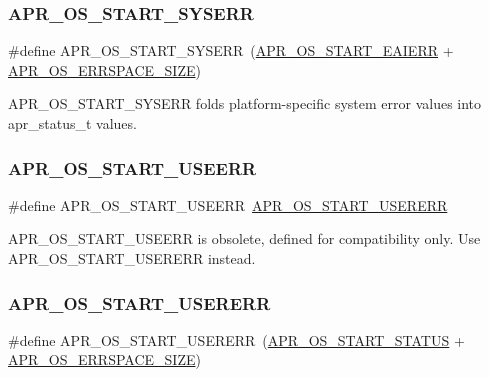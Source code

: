 \subsubsection{\texorpdfstring{A\+P\+R\+\_\+\+O\+S\+\_\+\+S\+T\+A\+R\+T\+\_\+\+S\+Y\+S\+E\+RR}{APR\_OS\_START\_SYSERR}}
{\footnotesize\ttfamily \#define A\+P\+R\+\_\+\+O\+S\+\_\+\+S\+T\+A\+R\+T\+\_\+\+S\+Y\+S\+E\+RR~(\mbox{\hyperlink{group__apr__errno_ga2d04991cb57c67a896e22125a1f22b49}{A\+P\+R\+\_\+\+O\+S\+\_\+\+S\+T\+A\+R\+T\+\_\+\+E\+A\+I\+E\+RR}} + \mbox{\hyperlink{group__apr__errno_gadb8d97e6836ccdc57b43b6119a5acccf}{A\+P\+R\+\_\+\+O\+S\+\_\+\+E\+R\+R\+S\+P\+A\+C\+E\+\_\+\+S\+I\+ZE}})}

A\+P\+R\+\_\+\+O\+S\+\_\+\+S\+T\+A\+R\+T\+\_\+\+S\+Y\+S\+E\+RR folds platform-\/specific system error values into apr\+\_\+status\+\_\+t values. \mbox{\label{group__apr__errno_ga803b8badf8695bdfa4fbcf4d330371f0}} 
\subsubsection{\texorpdfstring{A\+P\+R\+\_\+\+O\+S\+\_\+\+S\+T\+A\+R\+T\+\_\+\+U\+S\+E\+E\+RR}{APR\_OS\_START\_USEERR}}
{\footnotesize\ttfamily \#define A\+P\+R\+\_\+\+O\+S\+\_\+\+S\+T\+A\+R\+T\+\_\+\+U\+S\+E\+E\+RR~\mbox{\hyperlink{group__apr__errno_gacd35b2de1e38a1fa4717e38d5e153571}{A\+P\+R\+\_\+\+O\+S\+\_\+\+S\+T\+A\+R\+T\+\_\+\+U\+S\+E\+R\+E\+RR}}}

A\+P\+R\+\_\+\+O\+S\+\_\+\+S\+T\+A\+R\+T\+\_\+\+U\+S\+E\+E\+RR is obsolete, defined for compatibility only. Use A\+P\+R\+\_\+\+O\+S\+\_\+\+S\+T\+A\+R\+T\+\_\+\+U\+S\+E\+R\+E\+RR instead. \mbox{\label{group__apr__errno_gacd35b2de1e38a1fa4717e38d5e153571}} 
\subsubsection{\texorpdfstring{A\+P\+R\+\_\+\+O\+S\+\_\+\+S\+T\+A\+R\+T\+\_\+\+U\+S\+E\+R\+E\+RR}{APR\_OS\_START\_USERERR}}
{\footnotesize\ttfamily \#define A\+P\+R\+\_\+\+O\+S\+\_\+\+S\+T\+A\+R\+T\+\_\+\+U\+S\+E\+R\+E\+RR~(\mbox{\hyperlink{group__apr__errno_ga450e1a5734732e092ddaa5b67414f69b}{A\+P\+R\+\_\+\+O\+S\+\_\+\+S\+T\+A\+R\+T\+\_\+\+S\+T\+A\+T\+US}} + \mbox{\hyperlink{group__apr__errno_gadb8d97e6836ccdc57b43b6119a5acccf}{A\+P\+R\+\_\+\+O\+S\+\_\+\+E\+R\+R\+S\+P\+A\+C\+E\+\_\+\+S\+I\+ZE}})}

